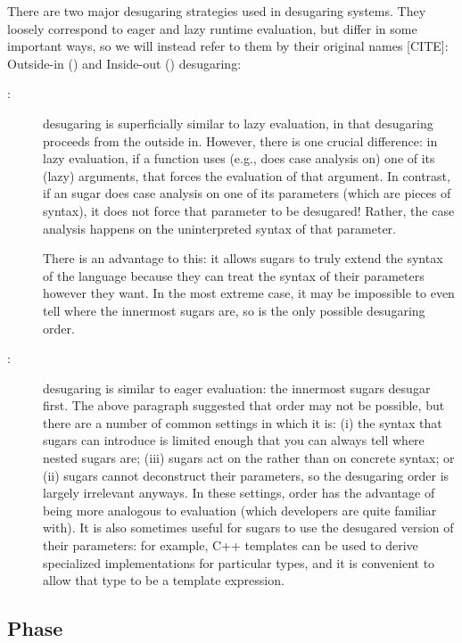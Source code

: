 There are two major desugaring strategies used in desugaring systems.
They loosely correspond to eager and lazy runtime evaluation, but
differ in some important ways, so we will instead refer
to them by their original names [CITE]: Outside-in () and
Inside-out () desugaring:
\begin{description}
\item[:]  desugaring is superficially similar to lazy
  evaluation, in that desugaring proceeds from the outside in.
  However, there is one crucial difference: in lazy evaluation, if a
  function uses (e.g., does case analysis on) one of its (lazy)
  arguments, that forces the evaluation of that argument. In contrast,
  if an  sugar does case analysis on one of its
  parameters (which are pieces of syntax), it does not force that
  parameter to be desugared! Rather, the case analysis happens on the
  uninterpreted syntax of that parameter.

  There is an advantage to this: it allows sugars to truly extend the
  syntax of the language because they can treat the syntax of their
  parameters however they want.
  In the most extreme case, it may be impossible
  to even tell where the innermost sugars are, so  is the only
  possible desugaring order.
\item[:]  desugaring is similar to eager evaluation: the
  innermost sugars desugar first. The above paragraph suggested that
   order may not be possible, but there are a number of common
  settings in which it is: (i) the syntax that sugars can introduce is
  limited enough that you can always tell where nested sugars are;
  (iii) sugars act on the  rather than on concrete syntax; or
  (ii) sugars cannot deconstruct their parameters, so the desugaring
  order is largely irrelevant anyways. In these settings, 
  order has the advantage of being more analogous to evaluation (which
  developers are quite familiar with). It is
  also sometimes useful for sugars to use the desugared version of
  their parameters: for example, C++ templates can be used to derive
  specialized implementations for particular types, and it is
  convenient to allow that type to be a template expression.
\end{description}


\subsection{Phase}

